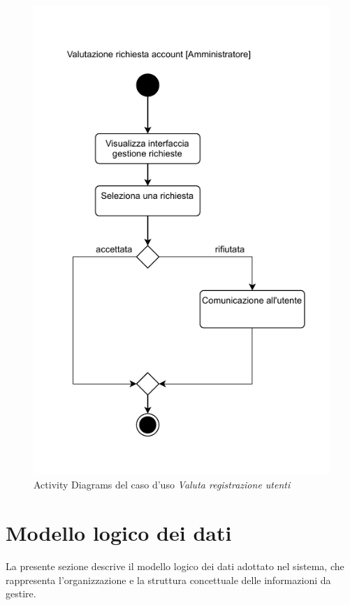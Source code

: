 \documentclass[a4paper]{article}
\begin{document}
\begin{figure}[H]
    \centering
    \includegraphics{./figures/valutazione_richiesta_ac}
    \caption{Activity Diagrams del caso d'uso \textit{Valuta registrazione utenti}}
    \label{fig:ac_carica_risorsa}
\end{figure}

\section{Modello logico dei dati}
La presente sezione descrive il modello logico dei dati adottato nel sistema, che rappresenta l’organizzazione e la struttura concettuale
delle informazioni da gestire.
\end{document}
